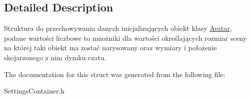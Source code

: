 \subsection{Detailed Description}
Struktura do przechowywania danych inicjalizujących obiekt klasy \mbox{\hyperlink{class_avatar}{Avatar}}, podane wartości liczbowe to mnożniki dla wartości określających rozmiar sceny na której taki obiekt ma zostać narysowany oraz wymiary i położenie skojarzonego z nim dymku czatu. 

The documentation for this struct was generated from the following file\+:\begin{DoxyCompactItemize}
\item 
Settings\+Container.\+h\end{DoxyCompactItemize}
